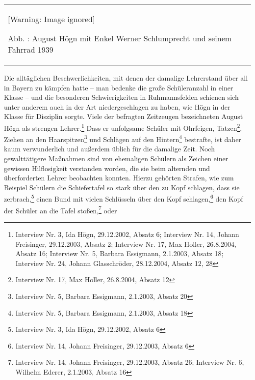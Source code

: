 \documentclass[a4paper]{article}
\newcommand\textstyleFunotenTextZchn[1]{#1}
\newcounter{Abb}
\renewcommand\theAbb{\arabic{Abb}}
\begin{document}
\begin{center}
\begin{minipage}{6.202cm}
\begin{center}
\tablefirsthead{}
\tablehead{}
\tabletail{}
\tablelasttail{}
\begin{supertabular}{m{6.0020003cm}}
  [Warning: Image ignored] %
 
Abb. \stepcounter{Abb}{\theAbb}: August Högn mit Enkel Werner
Schlumprecht und seinem Fahrrad 1939\\
\end{supertabular}
\end{center}
\end{minipage}
\end{center}
Die alltäglichen Beschwerlichkeiten, mit denen der damalige Lehrerstand
über all in Bayern zu kämpfen hatte – man bedenke die große
Schüleranzahl in einer Klasse – und die besonderen Schwierigkeiten in
Ruhmannsfelden schienen sich unter anderem auch in der Art
niedergeschlagen zu haben, wie Högn in der Klasse für Disziplin sorgte.
Viele der befragten Zeitzeugen bezeichneten August Högn als strengen
Lehrer.\footnote{ \textstyleFunotenTextZchn{Interview Nr. 3, Ida Högn,
29.12.2002, Absatz 6; Interview Nr. 14, Johann Freisinger, 29.12.2003,
Absatz 2; Interview Nr. 17, Max Holler, 26.8.2004, Absatz 16; Interview
Nr. 5, Barbara Essigmann, 2.1.2003, Absatz 18; Interview Nr. 24, Johann
Glasschröder, 28.12.2004, Absatz 12, 28}} Dass er unfolgsame Schüler
mit Ohrfeigen, Tatzen\footnote{ Interview Nr. 17, Max Holler,
26.8.2004, Absatz 12}, Ziehen an den Haarspitzen\footnote{ Interview
Nr. 5, Barbara Essigmann, 2.1.2003, Absatz 20} und Schlägen auf den
Hintern\footnote{ Interview Nr. 5, Barbara Essigmann, 2.1.2003, Absatz
18} bestrafte, ist daher kaum verwunderlich und außerdem üblich für die
damalige Zeit. Noch gewalttätigere Maßnahmen sind von ehemaligen
Schülern als Zeichen einer gewissen Hilflosigkeit verstanden worden,
die sie beim alternden und überforderten Lehrer beobachten konnten.
Hierzu gehörten Strafen, wie zum Beispiel Schülern die Schiefertafel so
stark über den zu Kopf schlagen, dass sie zerbrach,\footnote{ Interview
Nr. 3, Ida Högn, 29.12.2002, Absatz 6} einen Bund mit vielen Schlüsseln
über den Kopf schlagen,\footnote{ Interview Nr. 14, Johann Freisinger,
29.12.2003, Absatz 6} den Kopf der Schüler an die Tafel
stoßen,\footnote{ Interview Nr. 14, Johann Freisinger, 29.12.2003,
Absatz 26; Interview Nr. 6, Wilhelm Ederer, 2.1.2003, Absatz 16} oder
\end{document}
